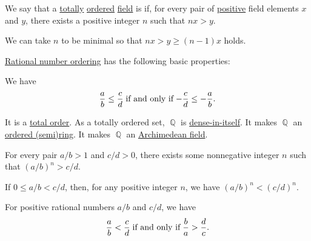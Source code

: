\begin{definition}\label{def:archimedean_field}
  We say that a \hyperref[def:totally_ordered_set]{totally} \hyperref[def:ordered_semiring]{ordered} \hyperref[def:field]{field} is  if, for every pair of \hyperref[def:ordered_semiring_positivity]{positive} field elements \( x \) and \( y \), there exists a positive integer \( n \) such that \( nx > y \).
\end{definition}
\begin{comments}
  \item We can take \( n \) to be minimal so that \( nx > y \geq (n-1)x \) holds.
\end{comments}

\begin{proposition}\label{thm:def:rational_numbers_ordering}
  \hyperref[def:rational_numbers_ordering]{Rational number ordering} has the following basic properties:
  \begin{thmenum}
     We have
    \begin{equation*}
      \frac a b \leq \frac c d \T{if and only if} -\frac c d \leq -\frac a b.
    \end{equation*}

     It is a \hyperref[def:totally_ordered_set]{total order}.
     As a totally ordered set, \( \BbbQ \) is \hyperref[def:dense_total_order]{dense-in-itself}.
     It makes \( \BbbQ \) an \hyperref[def:ordered_semiring]{ordered (semi)ring}.
     It makes \( \BbbQ \) an \hyperref[def:archimedean_field]{Archimedean field}.

     For every pair \( a / b > 1 \) and \( c / d > 0 \), there exists some nonnegative integer \( n \) such that \( (a / b)^n > c / d \).

     If \( 0 \leq a / b < c / d \), then, for any positive integer \( n \), we have \( (a / b)^n < (c / d)^n \).

     For positive rational numbers \( a / b \) and \( c / d \), we have
    \begin{equation}\label{eq:thm:def:rational_numbers_ordering/reciprocal}
      \frac a b < \frac c d \T{if and only if} \frac b a > \frac d c.
    \end{equation}
  \end{thmenum}
\end{proposition}
